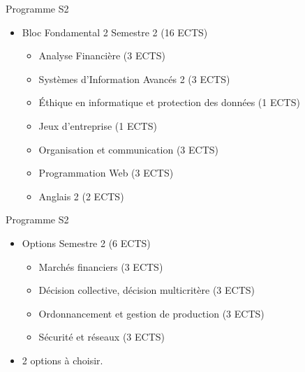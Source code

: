 \documentclass[minimal,compress]{beamer}
\begin{document}
\begin{frame}{Programme S2}
\begin{itemize}
\item \alert{Bloc Fondamental 2} Semestre 2 (16 ECTS)
\begin{itemize}
\item Analyse Financière (3 ECTS) 
\item Systèmes d’Information Avancés 2 (3 ECTS)
\item Éthique en informatique et protection des données (1 ECTS)
\item Jeux d’entreprise (1 ECTS)
\item Organisation et communication (3 ECTS)
\item Programmation Web (3 ECTS)
\item Anglais 2 (2 ECTS)
\end{itemize}
\end{itemize}
\end{frame}

\begin{frame}{Programme S2}
\begin{itemize}
\item \alert{Options} Semestre 2 (6 ECTS) %
\begin{itemize}
\item {Marchés financiers (3 ECTS)} 
\item Décision collective, décision multicritère (3 ECTS)
\item {Ordonnancement et  gestion de production (3 ECTS)}
\item Sécurité et réseaux (3 ECTS)
\end{itemize}
\item 2 options à choisir.
\end{itemize}
\end{frame}
\end{document}
